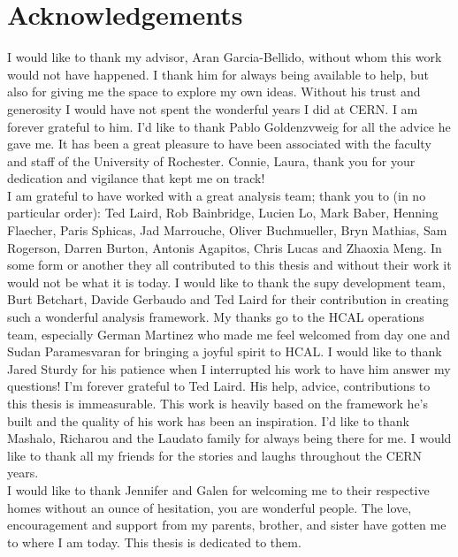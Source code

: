 \section*{Acknowledgements}

\indent I would like to thank my advisor, Aran Garcia-Bellido, without whom this work would not have happened. 
I thank him for always being available to help, but also for giving me the space to explore my own ideas. 
Without his trust and generosity I would have not spent the wonderful years I did at CERN. I am forever 
grateful to him. I'd like to thank Pablo Goldenzvweig for all the advice he gave me. It has been a great 
pleasure to have been associated with the faculty and staff of the University of Rochester. Connie, Laura, 
thank you for your dedication and vigilance that kept me on track! \\
\indent I am grateful to have worked with a great analysis team; thank you to (in no particular order): Ted Laird, 
Rob Bainbridge, Lucien Lo, Mark Baber, Henning Flaecher, Paris Sphicas, Jad Marrouche, Oliver Buchmueller, 
Bryn Mathias, Sam Rogerson, Darren Burton, Antonis Agapitos, Chris Lucas and Zhaoxia Meng. In some form or 
another they all contributed to this thesis and without their work it would not be what it is today. 
I would like to thank the supy development team, Burt Betchart, Davide Gerbaudo and Ted Laird for their contribution 
in creating such a wonderful analysis framework. My thanks go to the HCAL operations team, especially German 
Martinez who made me feel welcomed from day one and Sudan Paramesvaran for bringing a joyful spirit to HCAL.
I would like to thank Jared Sturdy for his patience when I interrupted his work to have him answer my questions! 
I'm forever grateful to Ted Laird. His help, advice, contributions to this thesis is immeasurable. This work is
heavily based on the framework he's built and the quality of his work has been an inspiration. I'd like to thank 
Mashalo, Richarou and the Laudato family for always being there for me. I would like to thank all my friends for 
the stories and laughs throughout the CERN years. \\
\indent I would like to thank Jennifer and Galen for welcoming me to their respective homes without
an ounce of hesitation, you are wonderful people. 
The love, encouragement and support from my parents, brother, and sister have gotten me to where I am today.
This thesis is dedicated to them. 
